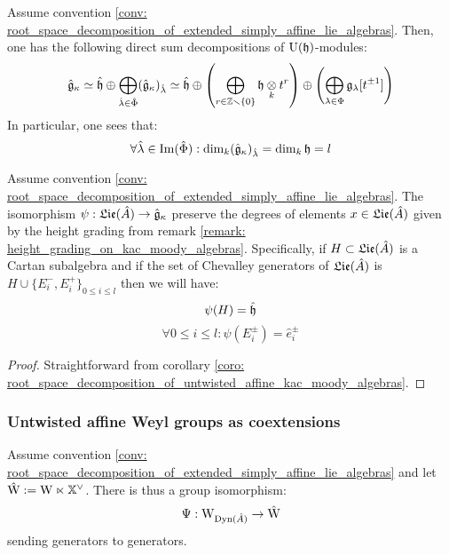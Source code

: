             \begin{corollary} \label{coro: root_space_decomposition_of_untwisted_affine_kac_moody_algebras}
                Assume convention \ref{conv: root_space_decomposition_of_extended_simply_affine_lie_algebras}. Then, one has the following direct sum decompositions of $\mathrm{U}(\mathfrak{h})$-modules:
                    $$\hat{\g}_{\kappa} \cong \hat{\h} \oplus \bigoplus_{\hat{\lambda} \in \hat{\Phi}} (\hat{\g}_{\kappa})_{\hat{\lambda}} \cong \hat{\h} \oplus \left(\bigoplus_{r \in \Z \setminus \{0\}} \h \tensor_k t^r\right) \oplus \left(\bigoplus_{\lambda \in \Phi} \g_{\lambda}[t^{\pm 1}]\right)$$
                In particular, one sees that:
                    $$\forall \hat{\lambda} \in \operatorname{Im}( \hat{\Phi} ): \dim_k (\hat{\mathfrak{g}}_{\kappa})_{\hat{\lambda}} = \dim_k \mathfrak{h} = l$$
            \end{corollary}
            \begin{proposition} \label{prop: untwisted_affinisation_preserves_root_heights}
                \cite[Theorem 12.2.15]{perrin_kac_moody_algebras} Assume convention \ref{conv: root_space_decomposition_of_extended_simply_affine_lie_algebras}. The isomorphism $\psi: \mathfrak{Lie}(\hat{A}) \to \hat{\mathfrak{g}}_{\kappa}$ preserve the degrees of elements $x \in \mathfrak{Lie}(\hat{A})$ given by the height grading from remark \ref{remark: height_grading_on_kac_moody_algebras}. Specifically, if $H \subset \mathfrak{Lie}(\hat{A})$ is a Cartan subalgebra and if the set of Chevalley generators of $\mathfrak{Lie}(\hat{A})$ is $H \cup \{E_i^-, E_i^+\}_{0 \leq i \leq l}$ then we will have:
                    $$\psi(H) = \hat{\mathfrak{h}}$$
                    $$\forall 0 \leq i \leq l: \psi(E_i^{\pm}) = \hat{e}_i^{\pm}$$
            \end{proposition}
                \begin{proof}
                    Straightforward from corollary \ref{coro: root_space_decomposition_of_untwisted_affine_kac_moody_algebras}. 
                \end{proof}
                
        \subsubsection{Untwisted affine Weyl groups as coextensions} \label{subsubsection: untwisted_affine_weyl_groups}
            
            \begin{proposition} \label{prop: untwisted_affine_weyl_groups_as_coextensions}
                \cite[Theorem 12.2.19]{perrin_kac_moody_algebras} Assume convention \ref{conv: root_space_decomposition_of_extended_simply_affine_lie_algebras} and let $\hat{\mathrm{W}} := \mathrm{W} \ltimes \mathbb{X}^{\vee}$. There is thus a group isomorphism:
                    $$\Psi: \mathrm{W}_{\mathrm{Dyn}(\hat{A})} \to \hat{\mathrm{W}}$$
                sending generators to generators. 
            \end{proposition}